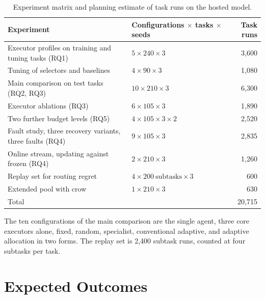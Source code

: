 \documentclass[11pt,a4paper]{article}
\newcommand{\head}[1]{\textbf{#1}}
\begin{document}
\begin{table}[h]
\centering\small
\caption{Experiment matrix and planning estimate of task runs on the hosted model.}
\label{tab:compute}
\begin{tabular}{@{}llr@{}}
\toprule
\head{Experiment} & \head{Configurations $\times$ tasks $\times$ seeds} & \head{Task runs} \\
\midrule
Executor profiles on training and tuning tasks (RQ1) & $5 \times 240 \times 3$ & 3,600 \\
Tuning of selectors and baselines & $4 \times 90 \times 3$ & 1,080 \\
Main comparison on test tasks (RQ2, RQ3) & $10 \times 210 \times 3$ & 6,300 \\
Executor ablations (RQ3) & $6 \times 105 \times 3$ & 1,890 \\
Two further budget levels (RQ5) & $4 \times 105 \times 3 \times 2$ & 2,520 \\
Fault study, three recovery variants, three faults (RQ4) & $9 \times 105 \times 3$ & 2,835 \\
Online stream, updating against frozen (RQ4) & $2 \times 210 \times 3$ & 1,260 \\
Replay set for routing regret & $4 \times 200\ \text{subtasks} \times 3$ & 600 \\
Extended pool with crow & $1 \times 210 \times 3$ & 630 \\
\midrule
Total & & 20,715 \\
\bottomrule
\end{tabular}

\vspace{3pt}
\parbox{0.92\textwidth}{\footnotesize\raggedright The ten configurations of the main comparison are the single agent, three core executors
alone, fixed, random, specialist, conventional adaptive, and adaptive allocation in two forms. The replay
set is 2,400 subtask runs, counted at four subtasks per task.}
\end{table}

\section{Expected Outcomes}
\end{document}
